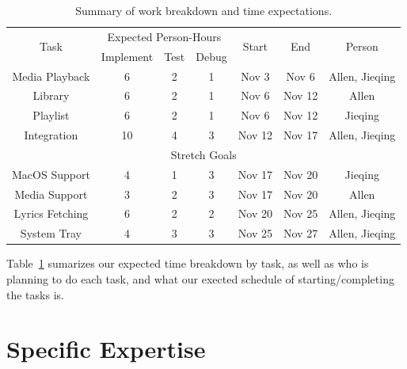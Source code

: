 \documentclass[12pt]{article}
\begin{document}
\begin{table}
\begin{center}
\begin{tabular}{|c|c|c|c|c|c|c|}
\hline
\multirow{2}{*}{Task}      &  \multicolumn{3}{|c|}{Expected Person-Hours}    &  \multirow{2}{*}{Start} & \multirow{2}{*}{End} & \multirow{2}{*}{Person} \\
                           &  Implement     & Test       & Debug            &                         &                      &                         \\
\hline
\hline
  Media Playback&   6            & 2          & 1                & Nov 3                   & Nov 6                & Allen, Jieqing  \\
  Library               &   6            & 2          & 1                & Nov 6                   & Nov 12               & Allen \\
  Playlist             &   6            & 2          & 1                & Nov 6                   & Nov 12               & Jieqing \\
  Integration   & 10 & 4 & 3 & Nov 12 & Nov 17 & Allen, Jieqing\\
\hline
 \multicolumn{7}{|c|}{Stretch Goals} \\
\hline
MacOS Support &   4           & 1         &   3                & Nov 17                  & Nov 20               & Jieqing\\
Media Support &   3           & 2         &   3                & Nov 17                  & Nov 20               & Allen \\
Lyrics Fetching &   6           & 2         &   2                & Nov 20                  & Nov 25               & Allen, Jieqing \\
System Tray &   4           & 3         &   3                & Nov 25                  & Nov 27               & Allen, Jieqing \\

\hline
\end{tabular}
\caption{Summary of work breakdown and time expectations.}
\label{Table:planSummary}
\end{center}
\end{table}

Table~\ref{Table:planSummary} sumarizes our expected time breakdown by task, as well as who is planning to do each task, and what our exected schedule of starting/completing the tasks is.


\section{Specific Expertise}
% 
\end{document}
